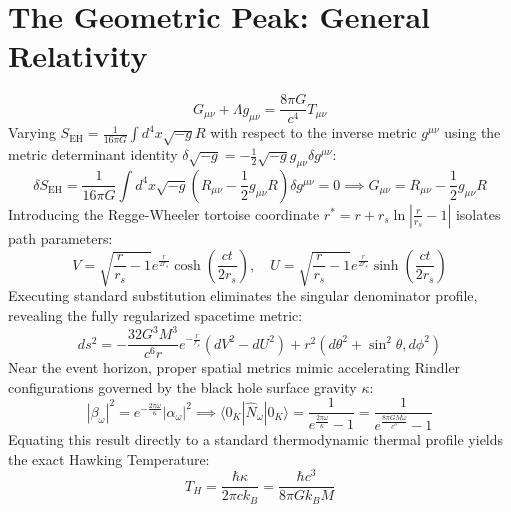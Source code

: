 \documentclass[11pt,a4paper]{article}
\begin{document}
\section{The Geometric Peak: General Relativity}
\begin{equation}
G_{\mu\nu} + \Lambda g_{\mu\nu} = \frac{8\pi G}{c^4} T_{\mu\nu} \label{eq:efe}
\end{equation}
Varying $S_{\text{EH}} = \frac{1}{16\pi G} \int d^4x \sqrt{-g} R$ with respect to the inverse metric $g^{\mu\nu}$ using the metric determinant identity $\delta\sqrt{-g} = -\frac{1}{2}\sqrt{-g}g_{\mu\nu}\delta g^{\mu\nu}$:
\begin{equation}
\delta S_{\text{EH}} = \frac{1}{16\pi G} \int d^4x \sqrt{-g} \left( R_{\mu\nu} - \frac{1}{2}g_{\mu\nu}R \right) \delta g^{\mu\nu} = 0 \implies G_{\mu\nu} = R_{\mu\nu} - \frac{1}{2}g_{\mu\nu}R
\end{equation}
Introducing the Regge-Wheeler tortoise coordinate $r^* = r + r_s \ln \left| \frac{r}{r_s} - 1 \right|$ isolates path parameters:
\begin{equation}
V = \sqrt{\frac{r}{r_s} - 1} e^{\frac{r}{2r_s}} \cosh\left(\frac{ct}{2r_s}\right), \quad U = \sqrt{\frac{r}{r_s} - 1} e^{\frac{r}{2r_s}} \sinh\left(\frac{ct}{2r_s}\right)
\end{equation}
Executing standard substitution eliminates the singular denominator profile, revealing the fully regularized spacetime metric:
\begin{equation}
ds^2 = -\frac{32G^3M^3}{c^6 r} e^{-\frac{r}{r_s}} (dV^2 - dU^2) + r^2(d\theta^2 + \sin^2\theta , d\phi^2)
\end{equation}
Near the event horizon, proper spatial metrics mimic accelerating Rindler configurations governed by the black hole surface gravity $\kappa$:
\begin{equation}
|\beta_{\omega}|^2 = e^{-\frac{2\pi\omega}{\kappa}} |\alpha_{\omega}|^2 \implies \langle 0_K | \hat{N}_\omega | 0_K \rangle = \frac{1}{e^{\frac{2\pi\omega}{\kappa}} - 1} = \frac{1}{e^{\frac{8\pi GM\omega}{c^3}} - 1}
\end{equation}
Equating this result directly to a standard thermodynamic thermal profile yields the exact Hawking Temperature:
\begin{equation}
T_H = \frac{\hbar \kappa}{2\pi c k_B} = \frac{\hbar c^3}{8\pi G k_B M}
\end{equation}
\end{document}
